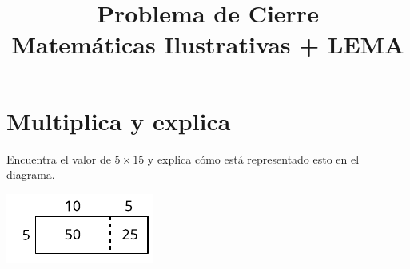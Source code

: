 \documentclass[,]{article}
\title{Problema de Cierre\\Matemáticas Ilustrativas + LEMA}
\date{}
\begin{document}
\maketitle
\vspace{-1cm}
\section*{Multiplica y explica}
\begin{sidebyside}{2}{0}{0}{0}%
\begin{sbspanel}{0.5}%
Encuentra el valor de \(5\times 15\) y explica cómo está representado esto en el diagrama.%
\end{sbspanel}%
\begin{sbspanel}{0.5}%
\includegraphics[max width=\linewidth,center]{../svg-source/tikz-file-147479.pdf}
\end{sbspanel}%
\end{sidebyside}%
\end{document}
